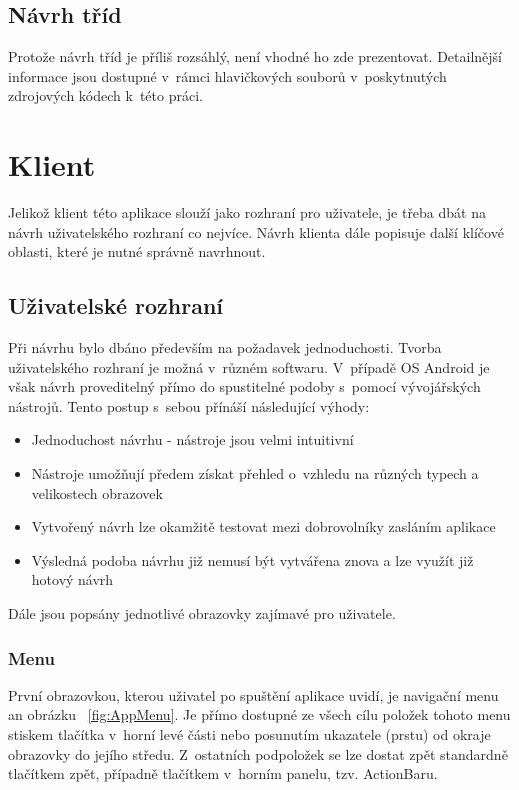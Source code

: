 \documentclass[thesis=B,czech]{FITthesis}[2013/10/20]
\begin{document}
\subsection{Návrh tříd}

Protože návrh tříd je příliš rozsáhlý, není vhodné ho zde prezentovat. Detailnější informace jsou dostupné v~rámci hlavičkových souborů v~poskytnutých zdrojových kódech k~této práci.

\section{Klient}

Jelikož klient této aplikace slouží jako rozhraní pro uživatele, je třeba dbát na návrh uživatelského rozhraní co nejvíce. Návrh klienta dále popisuje další klíčové oblasti, které je nutné správně navrhnout.

\subsection{Uživatelské rozhraní}

Při návrhu bylo dbáno především na požadavek jednoduchosti. Tvorba uživatelského rozhraní je možná v~různém softwaru. V~případě OS Android je však návrh proveditelný přímo do spustitelné podoby s~pomocí vývojářských nástrojů. Tento postup s~sebou přínáší následující výhody:

\begin{itemize}
  \item{Jednoduchost návrhu - nástroje jsou velmi intuitivní}
  \item{Nástroje umožňují předem získat přehled o~vzhledu na různých typech a velikostech obrazovek}
  \item{Vytvořený návrh lze okamžitě testovat mezi dobrovolníky zasláním aplikace}
  \item{Výsledná podoba návrhu již nemusí být vytvářena znova a lze využít již hotový návrh}
\end{itemize}

Dále jsou popsány jednotlivé obrazovky zajímavé pro uživatele.

\subsubsection{Menu}

První obrazovkou, kterou uživatel po spuštění aplikace uvidí, je navigační menu an obrázku ~\ref{fig:AppMenu}. Je přímo dostupné ze všech cílu položek tohoto menu stiskem tlačítka v~horní levé části nebo posunutím ukazatele (prstu) od okraje obrazovky do jejího středu. Z~ostatních podpoložek se lze dostat zpět standardně tlačítkem zpět, případně tlačítkem v~horním panelu, tzv. ActionBaru.
\end{document}
